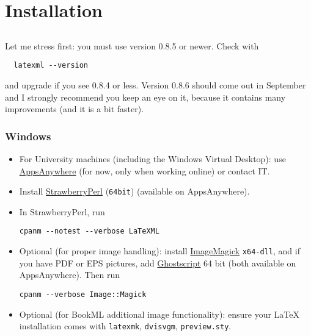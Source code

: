 \documentclass[a4paper]{article}
\theoremstyle{definition}
\begin{document}
\tableofcontents

\section{Installation}

\subsection{\texorpdfstring{\LaTeXML{}}{LaTeXML}}
Let me stress first: you must use \LaTeXML{} version 0.8.5 or newer. Check with
\begin{lstlisting}
  latexml --version
\end{lstlisting}
and upgrade if you see 0.8.4 or less. Version 0.8.6 should come out in September and I strongly recommend you keep an eye on it, because it contains many improvements (and it is a bit faster).

\subsubsection*{Windows}
\begin{itemize}
  \item For University machines (including the Windows Virtual Desktop): use \href{https://it.leeds.ac.uk/it?id=kb_article&sysparm_article=KB0014827}{AppsAnywhere} (for now, only when working online) or contact IT.
  \item Install \href{https://strawberryperl.com/}{StrawberryPerl} (\texttt{64bit}) (available on AppsAnywhere).
  \item In StrawberryPerl, run
    \begin{lstlisting}
cpanm --notest --verbose LaTeXML
    \end{lstlisting}
  \item Optional (for proper image handling): install \href{https://imagemagick.org/script/download.php}{ImageMagick} \texttt{x64-dll}, and if you have PDF or EPS pictures, add \href{https://www.ghostscript.com/download/gsdnld.html}{Ghostscript} 64 bit (both available on AppsAnywhere). Then run
    \begin{lstlisting}
cpanm --verbose Image::Magick
    \end{lstlisting}
  \item Optional (for BookML additional image functionality): ensure your \LaTeX{} installation comes with \texttt{latexmk}, \texttt{dvisvgm}, \texttt{preview.sty}.
\end{itemize}
\end{document}
